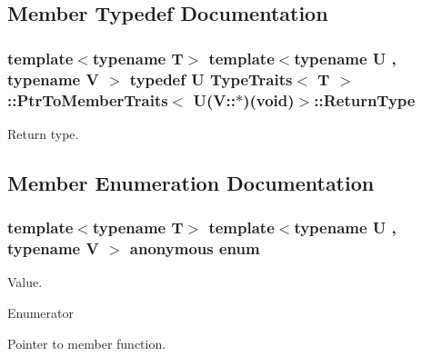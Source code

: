 \subsection{Member Typedef Documentation}
\subsubsection[{\texorpdfstring{Return\+Type}{ReturnType}}]{\setlength{\rightskip}{0pt plus 5cm}template$<$typename T$>$ template$<$typename U , typename V $>$ typedef U {\bf Type\+Traits}$<$ T $>$\+::{\bf Ptr\+To\+Member\+Traits}$<$ U(V\+::$\ast$)(void)$>$\+::{\bf Return\+Type}}\hypertarget{structTypeTraits_1_1PtrToMemberTraits_3_01U_07V_1_1_5_08_07void_08_4_a1b7ee84f9134e7802a6c17a684e5d094}{}\label{structTypeTraits_1_1PtrToMemberTraits_3_01U_07V_1_1_5_08_07void_08_4_a1b7ee84f9134e7802a6c17a684e5d094}
Return type. 

\subsection{Member Enumeration Documentation}
\subsubsection[{\texorpdfstring{anonymous enum}{anonymous enum}}]{\setlength{\rightskip}{0pt plus 5cm}template$<$typename T$>$ template$<$typename U , typename V $>$ anonymous enum}\hypertarget{structTypeTraits_1_1PtrToMemberTraits_3_01U_07V_1_1_5_08_07void_08_4_a484ebbde0a8818f1553ee0bc7c5224f3}{}\label{structTypeTraits_1_1PtrToMemberTraits_3_01U_07V_1_1_5_08_07void_08_4_a484ebbde0a8818f1553ee0bc7c5224f3}
Value. \begin{Desc}
\item[Enumerator]\par
\begin{description}
\item[{\em 
Is\+Pointer\+To\+Member\hypertarget{structTypeTraits_1_1PtrToMemberTraits_3_01U_07V_1_1_5_08_07void_08_4_a484ebbde0a8818f1553ee0bc7c5224f3aa4051e64d12bc01c66d7d76cfe9606d4}{}\label{structTypeTraits_1_1PtrToMemberTraits_3_01U_07V_1_1_5_08_07void_08_4_a484ebbde0a8818f1553ee0bc7c5224f3aa4051e64d12bc01c66d7d76cfe9606d4}
}]Pointer to member function. \end{description}
\end{Desc}


